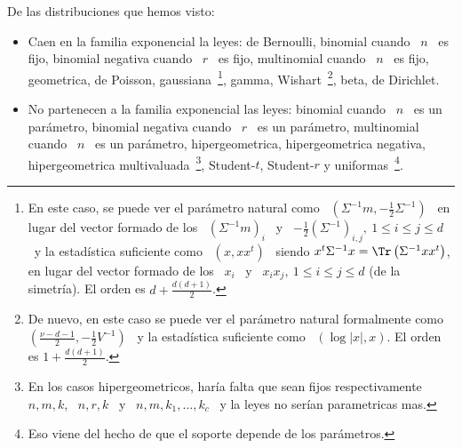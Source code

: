 De las distribuciones que hemos visto:
%
\begin{itemize}
\item Caen en  la familia exponencial la leyes: de  Bernoulli, binomial cuando \
  $n$ \ es fijo, binomial negativa cuando  \ $r$ \ es fijo, multinomial cuando \
  $n$ \  es fijo, geometrica,  de Poisson, gaussiana~\footnote{En este  caso, se
    puede ver  el par\'ametro  natural como \  $\left( \Sigma^{-1} m  , -\frac12
      \Sigma^{-1}  \right)$ \  en  lugar del  vector  formado de  los \  $\left(
      \Sigma^{-1} m \right)_i$ \ y \ $-\frac12 \left( \Sigma^{-1} \right)_{i,j},
    \: 1 \le i \le j \le d$ \ y la estad\'istica suficiente como \ $\left( x , x
      x^t \right)$  \ siendo  $x^t \Sigma^{-1} x  = \Tr\left( \Sigma^{-1}  x x^t
    \right)$, en lugar  del vector formado de los  \ $x_i$ \ y \ $x_i  x_j, \: 1
    \le  i  \le  j \le  d$  (de  la  simetr\'ia).   El  orden es  $d  +  \frac{d
      (d+1)}{2}$.}, gamma, Wishart~\footnote{De nuevo, en este caso se puede ver
    el  par\'ametro  natural  formalmente  como \  $\left(  \frac{\nu-d-1}{2}  ,
      -\frac12 V^{-1}  \right)$ \ y  la estad\'istica suficiente como  \ $\left(
      \log |x|  , x \right)$.  El orden  es $1 + \frac{d  (d+1)}{2}$.}, beta, de
  Dirichlet.
%
%
\item No partenecen a la familia  exponencial las leyes: binomial cuando \ $n$ \
  es  un  par\'ametro, binomial  negativa  cuando \  $r$  \  es un  par\'ametro,
  multinomial cuando \ $n$ \ es un par\'ametro, hipergeometrica, hipergeometrica
  negativa,     hipergeometrica      multivaluada~\footnote{En     los     casos
    hipergeometricos, har\'ia falta que sean  fijos respectivamente \ $n, m, k$,
    \ $n,  r, k$  \ y  \ $n,  m, k_1, \ldots  , k_c$  \ y  la leyes  no ser\'ian
    parametricas mas.}, Student-$t$, Student-$r$ y uniformas~\footnote{Eso viene
    del hecho de que el soporte depende de los par\'ametros.}.
\end{itemize}


